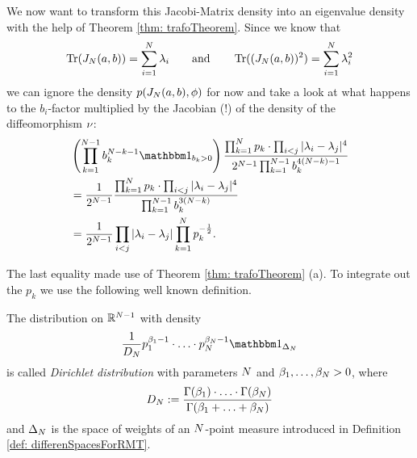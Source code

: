 We now want to transform this Jacobi-Matrix density into an eigenvalue density with the help of Theorem \ref{thm: trafoTheorem}. Since we know that
$$ \operatorname{Tr}(J_N(a,b)) = \sum_{i=1}^N \lambda_i \qquad \text{and} \qquad \operatorname{Tr}((J_N(a,b))^2) = \sum_{i=1}^N \lambda_i^2 $$
we can ignore the density $p(J_N(a,b),\phi)$ for now and take a look at what happens to the $b_i$-factor multiplied by the Jacobian (!) of the density of the diffeomorphism $\nu$:
\begin{align*}
    & \left(\prod_{k=1}^{\dimension-1} b_k^{\dimension-k-1} \ind_{b_k>0} \right)
    \frac{\prod_{k=1}^\dimension p_k \cdot \prod_{i<j} |\lambda_i - \lambda_j|^4}{2^{\dimension-1} \prod_{k=1}^{\dimension-1} b_k^{4(\dimension - k)-1}} \\
    & = \frac{1}{2^{\dimension-1}}  \frac{\prod_{k=1}^\dimension p_k \cdot \prod_{i<j} |\lambda_i - \lambda_j|^4}{\prod_{k=1}^{\dimension-1} b_k^{3(\dimension - k)}} \\
    & = \frac{1}{2^{\dimension-1}} \prod_{i<j} |\lambda_i - \lambda_j| \prod_{k=1}^\dimension p_k^{-\frac{1}{2}}.
\end{align*}

The last equality made use of Theorem \ref{thm: trafoTheorem} (a). To integrate out the $p_k$ we use the following well known definition.

\begin{definition}
    The distribution on $\mathbb{R}^{N-1}$ with density
    \begin{align*}
        \frac{1}{D_N} p_1^{\beta_1 - 1} \cdot \ldots \cdot p_\dimension^{\beta_\dimension-1} \ind_{\weightSpace}
    \end{align*}
    is called \textit{Dirichlet distribution} with parameters $N$ and $\beta_1,\ldots,\beta_N > 0$, where
    \begin{align*}
        D_N := \frac{\Gamma(\beta_1)\cdot \ldots \cdot \Gamma(\beta_{N})}{\Gamma(\beta_1+\ldots+\beta_N)}
    \end{align*}
    and $\Delta_N$ is the space of weights of an $N$-point measure introduced in Definition \ref{def: differenSpacesForRMT}.
\end{definition}

